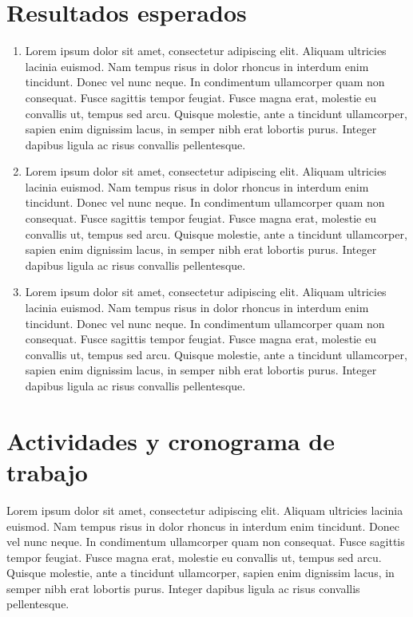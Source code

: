 \section{Resultados esperados}
\begin{enumerate}
\item Lorem ipsum dolor sit amet, consectetur adipiscing elit. Aliquam ultricies lacinia euismod. Nam tempus risus in dolor rhoncus in interdum enim tincidunt. Donec vel nunc neque. In condimentum ullamcorper quam non consequat. Fusce sagittis tempor feugiat. Fusce magna erat, molestie eu convallis ut, tempus sed arcu. Quisque molestie, ante a tincidunt ullamcorper, sapien enim dignissim lacus, in semper nibh erat lobortis purus. Integer dapibus ligula ac risus convallis pellentesque.
\item Lorem ipsum dolor sit amet, consectetur adipiscing elit. Aliquam ultricies lacinia euismod. Nam tempus risus in dolor rhoncus in interdum enim tincidunt. Donec vel nunc neque. In condimentum ullamcorper quam non consequat. Fusce sagittis tempor feugiat. Fusce magna erat, molestie eu convallis ut, tempus sed arcu. Quisque molestie, ante a tincidunt ullamcorper, sapien enim dignissim lacus, in semper nibh erat lobortis purus. Integer dapibus ligula ac risus convallis pellentesque.
\item Lorem ipsum dolor sit amet, consectetur adipiscing elit. Aliquam ultricies lacinia euismod. Nam tempus risus in dolor rhoncus in interdum enim tincidunt. Donec vel nunc neque. In condimentum ullamcorper quam non consequat. Fusce sagittis tempor feugiat. Fusce magna erat, molestie eu convallis ut, tempus sed arcu. Quisque molestie, ante a tincidunt ullamcorper, sapien enim dignissim lacus, in semper nibh erat lobortis purus. Integer dapibus ligula ac risus convallis pellentesque.
\end{enumerate}

\section{Actividades y cronograma de trabajo}

Lorem ipsum dolor sit amet, consectetur adipiscing elit. Aliquam ultricies lacinia euismod. Nam tempus risus in dolor rhoncus in interdum enim tincidunt. Donec vel nunc neque. In condimentum ullamcorper quam non consequat. Fusce sagittis tempor feugiat. Fusce magna erat, molestie eu convallis ut, tempus sed arcu. Quisque molestie, ante a tincidunt ullamcorper, sapien enim dignissim lacus, in semper nibh erat lobortis purus. Integer dapibus ligula ac risus convallis pellentesque.

